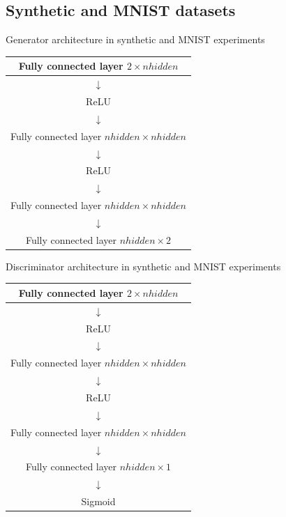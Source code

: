 \documentclass{article} %
\begin{document}
\subsection{Synthetic and MNIST datasets}
Generator architecture in synthetic and MNIST experiments
\begin{center}
\begin{tabular}{|c|}
\hline
Fully connected layer $2 \times nhidden$ \\
\hline
$\downarrow$ \\
\hline
ReLU \\
\hline
$\downarrow$ \\
\hline
Fully connected layer $nhidden \times nhidden$ \\
\hline
$\downarrow$ \\
\hline
ReLU \\
\hline 
$\downarrow$ \\
\hline
Fully connected layer $nhidden \times nhidden$ \\
\hline
$\downarrow$ \\
\hline
Fully connected layer $nhidden \times 2$ \\
\hline
\end{tabular}
\end{center}

Discriminator architecture in synthetic and MNIST experiments
\begin{center}
\begin{tabular}{|c|}
\hline
Fully connected layer $2 \times nhidden$ \\
\hline
$\downarrow$ \\
\hline
ReLU \\
\hline
$\downarrow$ \\
\hline
Fully connected layer $nhidden \times nhidden$ \\
\hline
$\downarrow$ \\
\hline
ReLU \\
\hline 
$\downarrow$ \\
\hline
Fully connected layer $nhidden \times nhidden$ \\
\hline
$\downarrow$ \\
\hline
Fully connected layer $nhidden \times 1$ \\
\hline
$\downarrow$ \\
\hline
Sigmoid \\
\hline
\end{tabular}
\end{center}
\end{document}
